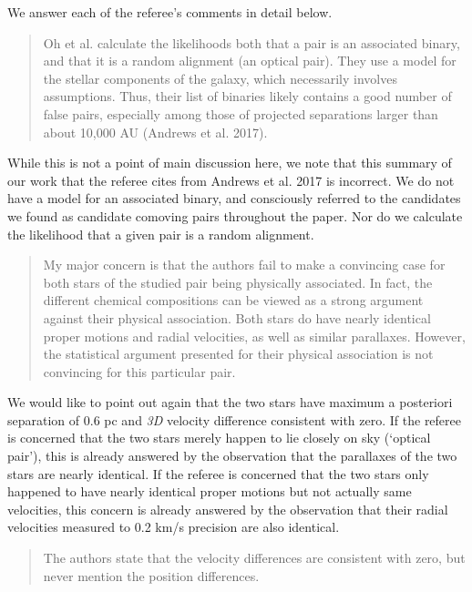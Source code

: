 \documentclass[12pt]{article}
\begin{document}
We answer each of {\sf the referee's comments} in detail below.

\begin{quote}
Oh et al. calculate the likelihoods both that a pair is an associated
binary, and that it is a random alignment (an optical pair). They use a
model for the stellar components of the galaxy, which necessarily
involves assumptions. Thus, their list of binaries likely contains a
good number of false pairs, especially among those of projected
separations larger than about 10,000 AU (Andrews et al. 2017).
\end{quote}

While this is not a point of main discussion here, we note that this
summary of our work that the referee cites from Andrews et al. 2017 is
incorrect. We do not have a model for an associated binary, and
consciously referred to the candidates we found as candidate comoving pairs
throughout the paper.
Nor do we calculate the likelihood that a given pair is a random alignment.

\begin{quote}
My major concern is that the authors fail to make a convincing case for
both stars of the studied pair being physically associated. In fact, the
different chemical compositions can be viewed as a strong argument
against their physical association. Both stars do have nearly identical
proper motions and radial velocities, as well as similar parallaxes.
However, the statistical argument presented for their physical
association is not convincing for this particular pair.
\end{quote}

We would like to point out again that the two stars have maximum a
posteriori separation of 0.6 pc and \emph{3D} velocity difference
consistent with zero. If the referee is concerned that the two stars
merely happen to lie closely on sky (`optical pair'), this is already
answered by the observation that the parallaxes of the two stars are
nearly identical. If the referee is concerned that the two stars only
happened to have nearly identical proper motions but not actually same
velocities, this concern is already answered by the observation that
their radial velocities measured to 0.2 km/s precision are also
identical.

\begin{quote}
The authors state that the velocity differences are consistent with
zero, but never mention the position differences.
\end{quote}
\end{document}
